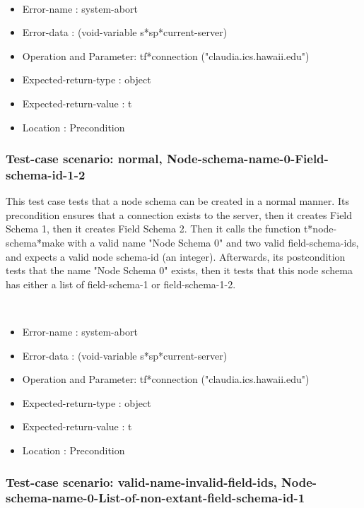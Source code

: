 \
\begin {itemize}
\item 	Error-name             : system-abort
\item Error-data             : (void-variable s*sp*current-server)
\item Operation and Parameter: tf*connection ("claudia.ics.hawaii.edu")
\item Expected-return-type   : object
\item Expected-return-value  : t
\item Location               : Precondition



\end {itemize}
\subsubsection {Test-case scenario: normal, Node-schema-name-0-Field-schema-id-1-2}


This test case tests that a node schema can be created in a normal manner.
Its precondition ensures that a connection exists to the server, then it creates Field Schema 1, then it creates Field Schema 2.
Then it calls the function t*node-schema*make  with a valid name "Node Schema 0" and two valid field-schema-ids, and expects a valid node schema-id (an integer).
Afterwards, its postcondition tests that the name "Node Schema 0" exists, then it tests that this node schema has either a list of field-schema-1 or field-schema-1-2.


\
\begin {itemize}
\item 	Error-name             : system-abort
\item Error-data             : (void-variable s*sp*current-server)
\item Operation and Parameter: tf*connection ("claudia.ics.hawaii.edu")
\item Expected-return-type   : object
\item Expected-return-value  : t
\item Location               : Precondition



\end {itemize}
\subsubsection {Test-case scenario: valid-name-invalid-field-ids, Node-schema-name-0-List-of-non-extant-field-schema-id-1}



